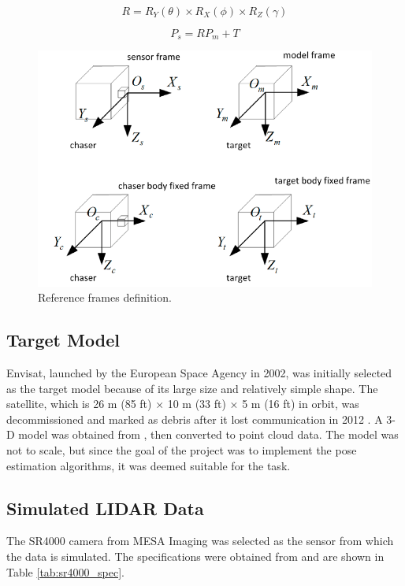 \documentclass[conference]{IEEEtran}
\begin{document}
		\begin{equation}
			\label{eqn:R}
			R = R_Y(\theta) \times R_X(\phi) \times R_Z(\gamma)
		\end{equation}
	
		\begin{equation}
			\label{eqn:Ps}
			P_s = RP_m + T
		\end{equation}
	
	\begin{figure}[htbp]
		\centerline{\includegraphics{Images/ReferenceFrames.PNG}}
		\caption{Reference frames definition.}
		\label{ReferenceFrames}
	\end{figure}


	\subsection{Target Model}
		Envisat, launched by the European Space Agency in 2002, was initially selected as the target model because of its large size and relatively simple shape. The satellite, which is 26 m (85 ft) × 10 m (33 ft) × 5 m (16 ft) in orbit, was decommissioned and marked as debris after it lost communication in 2012 \cite{envisat_overview}. A 3-D model was obtained from \cite{envisat_3d_model}, then converted to point cloud data. The model was not to scale, but since the goal of the project was to implement the pose estimation algorithms, it was deemed suitable for the task. 
	
	
	\subsection{Simulated LIDAR Data} 
		The SR4000 camera from MESA Imaging was selected as the sensor from which the data is simulated. The specifications were obtained from \cite{camera_specs} and are shown in Table \ref{tab:sr4000_spec}.
\end{document}
